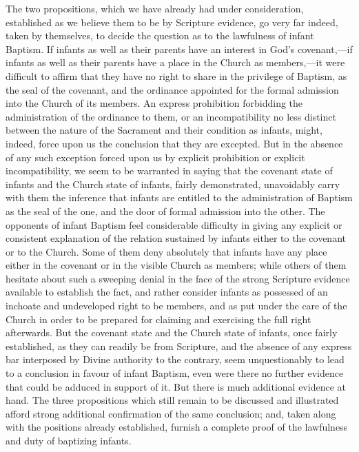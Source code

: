 \documentclass[
]{book}
\begin{document}
The two propositions, which we have already had under consideration, established as we believe them to be by Scripture evidence, go very far indeed, taken by themselves, to decide the question as to the lawfulness of infant Baptism. If infants as well as their parents have an interest in God's covenant,---if infants as well as their parents have a place in the Church as members,---it were difficult to affirm that they have no right to share in the privilege of Baptism, as the seal of the covenant, and the ordinance appointed for the formal admission into the Church of its members. An express prohibition forbidding the administration of the ordinance to them, or an incompatibility no less distinct between the nature of the Sacrament and their condition as infants, might, indeed, force upon us the conclusion that they are excepted. But in the absence of any such exception forced upon us by explicit prohibition or explicit incompatibility, we seem to be warranted in saying that the covenant state of infants and the Church state of infants, fairly demonstrated, unavoidably carry with them the inference that infants are entitled to the administration of Baptism as the seal of the one, and the door of formal admission into the other. The opponents of infant Baptism feel considerable difficulty in giving any explicit or consistent explanation of the relation sustained by infants either to the covenant or to the Church. Some of them deny absolutely that infants have any place either in the covenant or in the visible Church as members; while others of them hesitate about such a sweeping denial in the face of the strong Scripture evidence available to establish the fact, and rather consider infants as possessed of an inchoate and undeveloped right to be members, and as put under the care of the Church in order to be prepared for claiming and exercising the full right afterwards. But the covenant state and the Church state of infants, once fairly established, as they can readily be from Scripture, and the absence of any express bar interposed by Divine authority to the contrary, seem unquestionably to lead to a conclusion in favour of infant Baptism, even were there no further evidence that could be adduced in support of it. But there is much additional evidence at hand. The three propositions which still remain to be discussed and illustrated afford strong additional confirmation of the same conclusion; and, taken along with the positions already established, furnish a complete proof of the lawfulness and duty of baptizing infants.
\end{document}

